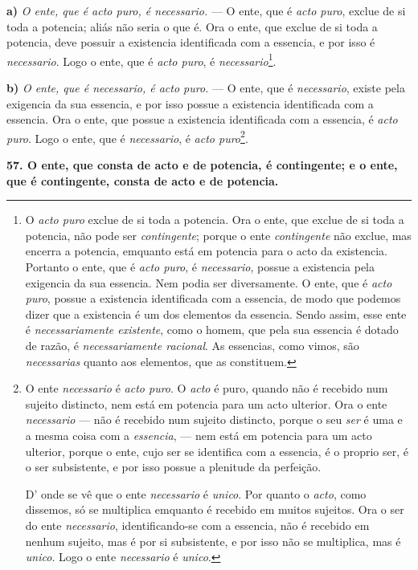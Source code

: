 \textbf{a)} \emph{O ente, que é acto puro, é necessario.} --- O ente, que é \emph{acto puro}, exclue de si toda a potencia; aliás não seria o que é. Ora o ente, que exclue de si toda a potencia, deve possuir a existencia identificada com a essencia, e por isso é \emph{necessario}. Logo o ente, que é \emph{acto puro}, é \emph{necessario}\footnote{O \emph{acto puro} exclue de si toda a potencia. Ora o ente, que exclue de si toda a potencia, não pode ser \emph{contingente}; porque o ente \emph{contingente} não exclue, mas encerra a potencia, emquanto está em potencia para o acto da existencia. Portanto o ente, que é \emph{acto puro}, é \emph{necessario}, possue a existencia pela exigencia da sua essencia. Nem podia ser diversamente. O ente, que é \emph{acto puro}, possue a existencia identificada com a essencia, de modo que podemos dizer que a existencia é um dos elementos da essencia. Sendo assim, esse ente é \emph{necessariamente existente}, como o homem, que pela sua essencia é dotado de razão, é \emph{necessariamente racional}. As essencias, como vimos, são \emph{necessarias} quanto aos elementos, que as constituem.}.

\textbf{b)} \emph{O ente, que é necessario, é acto puro.} --- O ente, que é \emph{necessario}, existe pela exigencia da sua essencia, e por isso possue a existencia identificada com a essencia. Ora o ente, que possue a existencia identificada com a essencia, é \emph{acto puro}. Logo o ente, que é \emph{necessario}, é \emph{acto puro}\footnote{O ente \emph{necessario} é \emph{acto puro}. O \emph{acto} é puro, quando não é recebido num sujeito distincto, nem está em potencia para um acto ulterior. Ora o ente \emph{necessario} --- não é recebido num sujeito distincto, porque o seu \emph{ser} é uma e a mesma coisa com a \emph{essencia}, --- nem está em potencia para um acto ulterior, porque o ente, cujo ser se identifica com a essencia, é o proprio ser, é o ser subsistente, e por isso possue a plenitude da perfeição.

\par D' onde se vê que o ente \emph{necessario} é \emph{unico}. Por quanto o \emph{acto}, como dissemos, só se multiplica emquanto é recebido em muitos sujeitos. Ora o ser do ente \emph{necessario}, identificando-se com a essencia, não é recebido em nenhum sujeito, mas é por si subsistente, e por isso não se multiplica, mas é \emph{unico}. Logo o ente \emph{necessario} é \emph{unico}.}.

\textbf{57. O ente, que consta de acto e de potencia, é contingente; e o ente, que é contingente, consta de acto e de potencia.}

